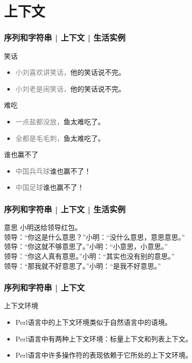 \section{上下文}
\begin{frame}
  \frametitle{序列和字符串 | 上下文 | 生活实例}
  \begin{block}{笑话}
    \begin{itemize}
      \item \textcolor{gray}{小刘喜欢讲笑话，}他的笑话说不完。
      \item \textcolor{gray}{小刘老是闹笑话，}他的笑话说不完。
    \end{itemize}
  \end{block}
  \pause
  \begin{block}{难吃}
    \begin{itemize}
      \item \textcolor{gray}{一点盐都没放，}鱼太难吃了。
      \item \textcolor{gray}{全都是毛毛刺，}鱼太难吃了。
    \end{itemize}
  \end{block}
  \pause
  \begin{block}{谁也赢不了}
    \begin{itemize}
      \item \textcolor{gray}{中国兵乓球}谁也赢不了！
      \item \textcolor{gray}{中国足球}谁也赢不了！
    \end{itemize}
  \end{block}
\end{frame}

\begin{frame}
  \frametitle{序列和字符串 | 上下文 | 生活实例}
  \begin{block}{意思}
小明送给领导红包。\\
领导：“你这是什么意思？”\qquad 小明：“没什么意思，意思意思。”\\
领导：“你这就不够意思了。”\quad 小明：“小意思，小意思。”\\
领导：“你这人真有意思。”\qquad 小明：“其实也没有别的意思。”\\
领导：“那我就不好意思了。”\quad 小明：“是我不好意思。”
  \end{block}
\end{frame}

\begin{frame}
  \frametitle{序列和字符串 | 上下文}
  \begin{block}{上下文环境}
    \begin{itemize}
      \item Perl语言中的上下文环境类似于自然语言中的语境。
      \item Perl语言中有两种上下文环境：标量上下文和列表上下文。
      \item Perl语言中许多操作符的表现依赖于它所处的上下文环境。
    \end{itemize}
  \end{block}
\end{frame}

